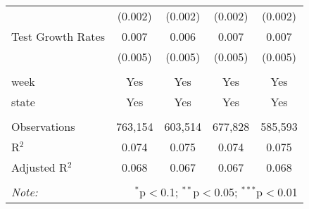 \begin{tabular}{@{\extracolsep{1pt}}lcccc}
  & (0.002) & (0.002) & (0.002) & (0.002) \\ 
  Test Growth Rates & 0.007 & 0.006 & 0.007 & 0.007 \\ 
  & (0.005) & (0.005) & (0.005) & (0.005) \\ 
 \hline \\[-1.8ex] 
week & Yes & Yes & Yes & Yes \\ 
state & Yes & Yes & Yes & Yes \\ 
\hline \\[-1.8ex] 
Observations & 763,154 & 603,514 & 677,828 & 585,593 \\ 
R$^{2}$ & 0.074 & 0.075 & 0.074 & 0.075 \\ 
Adjusted R$^{2}$ & 0.068 & 0.067 & 0.067 & 0.068 \\ 
\hline 
\hline \\[-1.8ex] 
\textit{Note:}  & \multicolumn{4}{r}{$^{*}$p$<$0.1; $^{**}$p$<$0.05; $^{***}$p$<$0.01} \\ 
\end{tabular} 